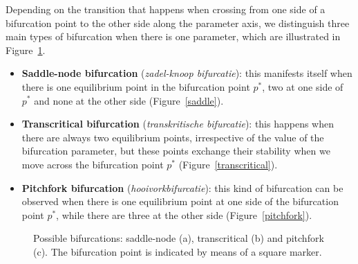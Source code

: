 Depending on the transition that happens when crossing from one side of a bifurcation point to the other side along the parameter axis, we distinguish three main types of bifurcation when there is one parameter, which are illustrated in Figure~\ref{bifurcaties}. 
\begin{itemize}
	\item \textbf{Saddle-node bifurcation} (\textit{zadel-knoop bifurcatie}): this manifests itself when there is one equilibrium point in the bifurcation point $p^*$, two at one side of $p^*$ and none at the other side (Figure~\ref{saddle}). 
	\item \textbf{Transcritical bifurcation} (\textit{transkritische bifurcatie}): this happens when there are always two equilibrium points, irrespective of the value of the bifurcation parameter, but these points exchange their stability when we move across the bifurcation point $p^*$ (Figure~\ref{transcritical}).
	\item \textbf{Pitchfork bifurcation} (\textit{hooivorkbifurcatie}): this kind of bifurcation can be observed when there is one equilibrium point at one side of the bifurcation point $p^*$, while there are three at the other side (Figure~\ref{pitchfork}). 
\end{itemize}

\begin{figure}[h]

\centerline{
\hspace{0.1cm}
\hspace{0.1cm}
}
\caption{Possible bifurcations: saddle-node (a), transcritical (b) and pitchfork (c). The bifurcation point is indicated by means of a square marker.} 
\label{bifurcaties}
\end{figure}

